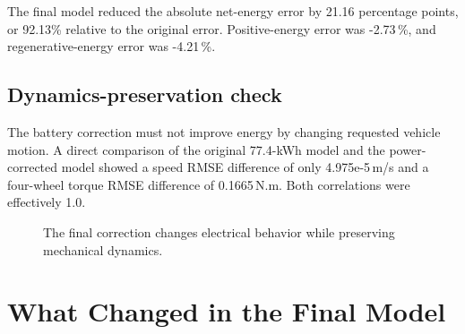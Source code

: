 \documentclass[11pt,letterpaper]{article}
\newcommand{\SI}[2]{#1\,#2}
\newcommand{\percent}{\%}
\begin{document}
The final model reduced the absolute net-energy error by 21.16 percentage
points, or 92.13\% relative to the original error. Positive-energy error was
\SI{-2.73}{\percent}, and regenerative-energy error was \SI{-4.21}{\percent}.

\subsection{Dynamics-preservation check}

The battery correction must not improve energy by changing requested vehicle
motion. A direct comparison of the original 77.4-kWh model and the
power-corrected model showed a speed RMSE difference of only
\SI{4.975e-5}{m/s} and a four-wheel torque RMSE difference of
\SI{0.1665}{N.m}. Both correlations were effectively 1.0.

\begin{figure}[H]
\centering
{}
\caption{The final correction changes electrical behavior while preserving mechanical dynamics.}
\end{figure}

\section{What Changed in the Final Model}
\end{document}

